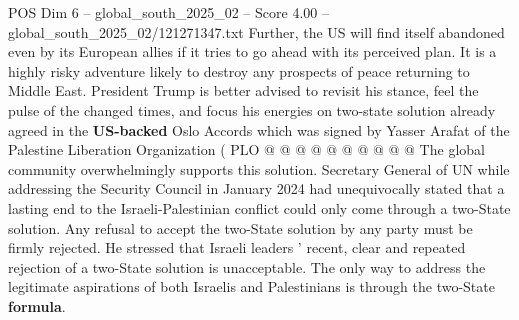 \begin{textsample}{POS Dim 6 – global\_south\_2025\_02 – Score 4.00 – global\_south\_2025\_02/121271347.txt}
Further, the US will find itself abandoned even by its European allies if it tries to go ahead with its perceived plan.
It is a highly risky adventure likely to destroy any prospects of peace returning to Middle East.
President Trump is better advised to revisit his stance, feel the pulse of the changed times, and focus his energies on two-state solution already agreed in the \textbf{US-backed} Oslo Accords which was signed by Yasser Arafat of the Palestine Liberation Organization ( PLO @ @ @ @ @ @ @ @ @ @ The global community overwhelmingly supports this solution.
Secretary General of UN while addressing the Security Council in January 2024 had unequivocally stated that a lasting end to the Israeli-Palestinian conflict could only come through a two-State solution.
Any refusal to accept the two-State solution by any party must be firmly rejected.
He stressed that Israeli leaders ' recent, clear and repeated rejection of a two-State solution is unacceptable.
The only way to address the legitimate aspirations of both Israelis and Palestinians is through the two-State \textbf{formula}.

\end{textsample}
